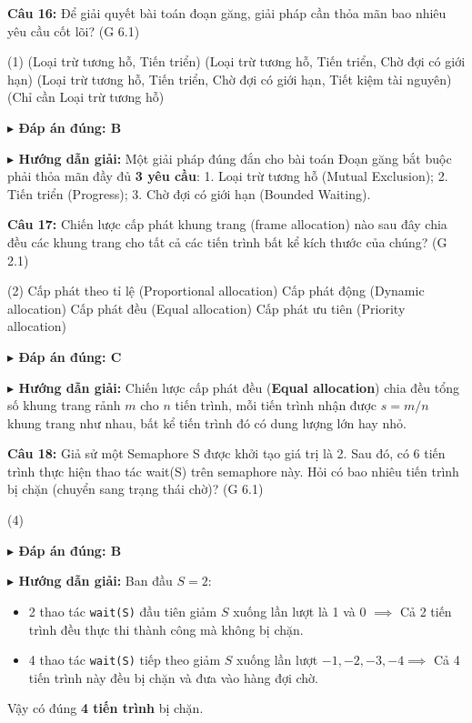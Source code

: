 \documentclass[11pt,a4paper]{article}
\newcommand{\giaithich}[2]{%
    \par\vspace{0.15cm}\noindent
    \begingroup\small
    \noindent\textbf{\color{blue}$\blacktriangleright$ Đáp án đúng: #1} \par\vspace{0.08cm}
    \noindent\textbf{\color{teal}$\blacktriangleright$ Hướng dẫn giải:} #2
    \endgroup\par\vspace{0.35cm}
}
\begin{document}
\noindent\textbf{Câu 16:} Để giải quyết bài toán đoạn găng, giải pháp cần thỏa mãn bao nhiêu yêu cầu cốt lõi? (G 6.1)
\begin{tasks}(1)
     (Loại trừ tương hỗ, Tiến triển)
     (Loại trừ tương hỗ, Tiến triển, Chờ đợi có giới hạn)
     (Loại trừ tương hỗ, Tiến triển, Chờ đợi có giới hạn, Tiết kiệm tài nguyên)
     (Chỉ cần Loại trừ tương hỗ)
\end{tasks}
\giaithich{B}{Một giải pháp đúng đắn cho bài toán Đoạn găng bắt buộc phải thỏa mãn đầy đủ \textbf{3 yêu cầu}:
1. Loại trừ tương hỗ (Mutual Exclusion);
2. Tiến triển (Progress);
3. Chờ đợi có giới hạn (Bounded Waiting).}

\noindent\textbf{Câu 17:} Chiến lược cấp phát khung trang (frame allocation) nào sau đây chia đều các khung trang cho tất cả các tiến trình bất kể kích thước của chúng? (G 2.1)
\begin{tasks}(2)
    \task Cấp phát theo tỉ lệ (Proportional allocation)
    \task Cấp phát động (Dynamic allocation)
    \task Cấp phát đều (Equal allocation)
    \task Cấp phát ưu tiên (Priority allocation)
\end{tasks}
\giaithich{C}{Chiến lược cấp phát đều (\textbf{Equal allocation}) chia đều tổng số khung trang rảnh $m$ cho $n$ tiến trình, mỗi tiến trình nhận được $s = m / n$ khung trang như nhau, bất kể tiến trình đó có dung lượng lớn hay nhỏ.}

\noindent\textbf{Câu 18:} Giả sử một Semaphore S được khởi tạo giá trị là 2. Sau đó, có 6 tiến trình thực hiện thao tác wait(S) trên semaphore này. Hỏi có bao nhiêu tiến trình bị chặn (chuyển sang trạng thái chờ)? (G 6.1)
\begin{tasks}(4)
\end{tasks}
\giaithich{B}{Ban đầu $S = 2$:
\begin{itemize}[noitemsep,topsep=1pt]
    \item 2 thao tác \texttt{wait(S)} đầu tiên giảm $S$ xuống lần lượt là 1 và 0 $\implies$ Cả 2 tiến trình đều thực thi thành công mà không bị chặn.
    \item 4 thao tác \texttt{wait(S)} tiếp theo giảm $S$ xuống lần lượt $-1, -2, -3, -4 \implies$ Cả 4 tiến trình này đều bị chặn và đưa vào hàng đợi chờ.
\end{itemize}
Vậy có đúng \textbf{4 tiến trình} bị chặn.}
\end{document}
